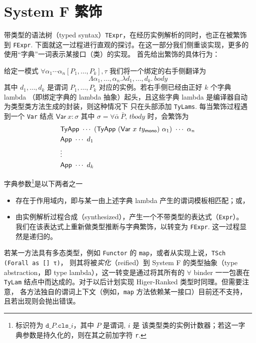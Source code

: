 \section{System F 繁饰}
带类型的语法树（typed syntax）\texttt{TExpr}，在经历实例解析的同时，也正在被繁饰到 \texttt{FExpr}.
下面就这一过程进行直观的探讨。在这一部分我们侧重谈实现，更多的使用“字典”一词表示某接口（类）的实现。
首先给出繁饰的具体行为：

给定一模式 $\forall \alpha_1 \cdots \alpha_n [P_1, \dots, P_k], \tau$
我们将一个绑定的右手侧翻译为
\begin{equation}
  \Lambda \alpha_1,\dots,\alpha_n.\lambda d_1,\dots,d_k.\ body
\end{equation}
其中 $d_1,\dots,d_k$ 是谓词 $P_1,\dots,P_k$ 对应的实例。若右手侧已经由正好 $k$ 个字典 lambda
（即绑定字典的 lambda 抽象）起头，且这些字典 lambda 是编译器自动为类型类方法生成的封装，则这种情况下
只在头部添加 \texttt{TyLams}.
每当繁饰过程遇到一个 \texttt{Var} 结点 $\mathsf{Var}\ x:\sigma$ 其中 $\sigma = \forall \bar{\alpha}\ \bar{P},\, tbody$
时，会繁饰为
\begin{equation}
  \begin{split}
    &\Tyapp\ \cdots\ (\Tyapp\ (\FVar\ x\ ty_\mathsf{mono})\ \alpha_1)\ \cdots\ \alpha_n\\
    &\mathsf{App}\ \cdots\ d_1\\
    &\vdots\\
    &\mathsf{App}\ \cdots\ d_k
  \end{split}
\end{equation}

字典参数\footnote{标识符为 $\mathtt{d}\texttt{\_}P\mathtt{.cls}\texttt{\_}{i}$，其中 $P$ 是谓词, $i$ 是
该类型类的实例计数器；若这一字典参数是持久化的，则在其之前加字符 \texttt{r}.}是以下两者之一
\vspace{-1em}
\begin{itemize}\itemsep-.8em
  \item 存在于作用域内，即与某一由上述字典 lambda 产生的谓词模板相匹配；或，
  \item 由实例解析过程合成（synthesized），产生一个不带类型的表达式（\texttt{Expr}）。
    我们在该表达式上重新做类型推断与字典繁饰，以转变为 \texttt{FExpr}. 这一过程显然是递归的。
\end{itemize}
若某一方法具有多态类型，例如 \texttt{Functor} 的 \texttt{map}，或者从实现上说，\texttt{TSch (Forall as [] τ)}，
则其将被\emph{实化}（reified）到 System F 的类型抽象（type abstraction，即 type lambda），这一转变是通过将其所有的
$\forall$ binder 一一包裹在 \texttt{TyLam} 结点中而达成的。对于以后计划实现 Higer-Ranked 类型时同理。但需要注意，
各方法独自的谓词上下文（例如，\texttt{map} 方法依赖某一接口）目前还不支持，且若出现则会抛出错误。


